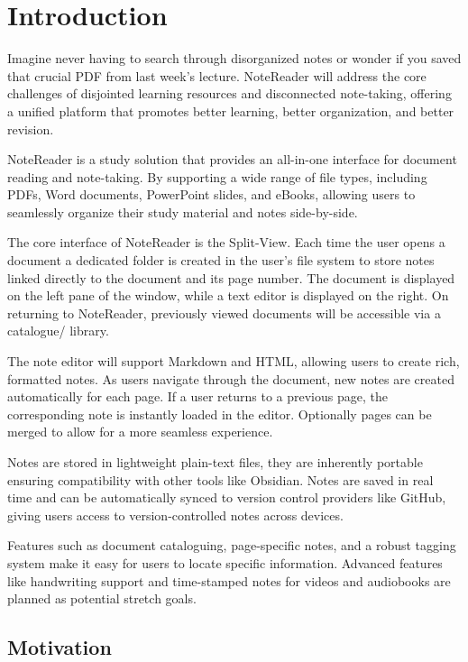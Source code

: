 \chapter{Introduction}
\label{chap:intro}

Imagine never having to search through disorganized notes or wonder if you saved that crucial PDF from last week’s lecture. NoteReader will address the core challenges of disjointed learning resources and disconnected note-taking, offering a unified platform that promotes better learning, better organization, and better revision.

NoteReader is a study solution that provides an all-in-one interface for document reading and note-taking. By supporting a wide range of file types, including PDFs, Word documents, PowerPoint slides, and eBooks, allowing users to seamlessly organize their study material and notes side-by-side. 

The core interface of NoteReader is the Split-View. Each time the user opens a document a dedicated folder is created in the user's file system to store notes linked directly to the document and its page number. The document is displayed on the left pane of the window, while a text editor is displayed on the right. On returning to NoteReader, previously viewed documents will be accessible via a catalogue/ library. 

The note editor will support Markdown and HTML, allowing users to create rich, formatted notes. As users navigate through the document, new notes are created automatically for each page. If a user returns to a previous page, the corresponding note is instantly loaded in the editor. Optionally pages can be merged to allow for a more seamless experience. 

Notes are stored in lightweight plain-text files, they are inherently portable ensuring compatibility with other tools like Obsidian. Notes are saved in real time and can be automatically synced to version control providers like GitHub, giving users access to version-controlled notes across devices. 

Features such as document cataloguing, page-specific notes, and a robust tagging system make it easy for users to locate specific information. Advanced features like handwriting support and time-stamped notes for videos and audiobooks are planned as potential stretch goals.


\section{Motivation}

